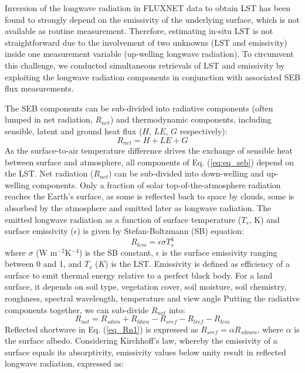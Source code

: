 \documentclass[fleqn,10pt]{wlscirep}
\begin{document}
  Inversion of the longwave radiation in FLUXNET data to obtain LST has been found to strongly depend on the emissivity of the underlying surface\cite{mallick2018bridging}, which is not available as routine measurement. Therefore, estimating in-situ LST is not straightforward due to the involvement of two unknowns (LST and emissivity) inside one measurement variable (up-welling longwave radiation). To circumvent this challenge, we conducted simultaneous retrievals of LST and emissivity by exploiting the longwave radiation components in conjunction with associated SEB flux measurements.

The SEB components can be sub-divided into radiative components (often lumped in net radiation, $R_{net}$) and thermodynamic components, including sensible, latent and ground heat flux ($H$, $LE$, $G$ respectively):
\begin{equation}\label{eq:eq_seb}
R_{net} = H + LE + G 
\end{equation}
As the surface-to-air temperature difference drives the exchange of sensible heat between surface and atmosphere, all components of Eq. (\ref{eq:eq_seb}) depend on the LST. Net radiation ($R_{net}$) can be sub-divided into down-welling and up-welling components. Only a fraction of solar top-of-the-atmosphere radiation reaches the Earth's surface, as some is reflected back to space by clouds, some is absorbed by the atmosphere and emitted later as longwave radiation. The emitted longwave radiation as a function of surface temperature ($T_s$, K) and surface emissivity ($\epsilon$) is given by Stefan-Boltzmann (SB) equation:
\begin{equation}\label{eq_Rlem}
R_{lem}= \epsilon \sigma T_{s}^{4}
\end{equation}
where $\sigma$ (W m$^{-2}$K$^{-4}$) is the SB constant, $\epsilon$ is the surface emissivity ranging between 0 and 1, and $T_{s}$ ($K$) is the LST.
Emissivity is defined as efficiency of a surface to emit thermal energy relative to a perfect black body. For a land surface, it depends on soil type, vegetation cover, soil moisture, soil chemistry, roughness, spectral wavelength, temperature and view angle\cite{norman1995terminology} 
Putting the radiative components together, we can sub-divide $R_{net}$ into:
\begin{equation}\label{eq_Rn1}
R_{net} = R_{sdwn} + R_{ldwn} - R_{sref} - R_{lref} - R_{lem}
\end{equation}
Reflected shortwave in Eq. ({\ref{eq_Rn1}}) is expressed as $R_{sref} = \alpha R_{sdown}$, where $\alpha$ is the surface albedo. Considering Kirchhoff's law, whereby the emissivity of a surface equals its absorptivity, emissivity values below unity result in reflected longwave radiation, expressed as: %
\end{document}
